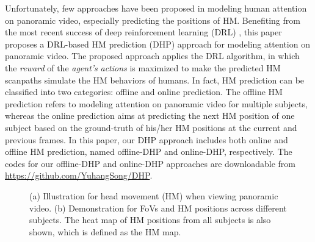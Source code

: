 \documentclass[10pt,journal,compsoc]{IEEEtran}
\begin{document}
Unfortunately, few approaches have been proposed in modeling human attention on panoramic video, especially predicting the positions of HM.
Benefiting from the most recent success of deep reinforcement learning (DRL) \cite{mnih2016asynchronous}, this paper proposes a DRL-based HM prediction (DHP) approach for modeling attention on panoramic video.
The proposed approach applies the DRL algorithm,  in which the \textit{reward} of the \textit{agent's} \textit{actions} is maximized to make the predicted HM scanpaths simulate the HM behaviors of humans.
In fact, HM prediction can be classified into two categories: offline and online prediction.
The offline HM prediction refers to modeling attention on panoramic video for multiple subjects, whereas the online prediction aims at predicting the next HM position of one subject based on the ground-truth of his/her HM positions at the current and previous frames. In this paper, our DHP approach includes both online and offline HM prediction, named offline-DHP and online-DHP, respectively.
The codes for our offline-DHP and online-DHP approaches are downloadable from \url{https://github.com/YuhangSong/DHP}.

\begin{figure}
	\begin{center}

        \vspace{-.5em}
		\caption{\footnotesize{(a) Illustration for head movement (HM) when viewing panoramic video. (b) Demonstration for FoVs and HM positions across different subjects. The heat map of HM positions from all subjects is also shown, which is defined as the HM map.}}
		\label{fig-one}
	\end{center}
\vspace{-2em}
\end{figure}
\end{document}
